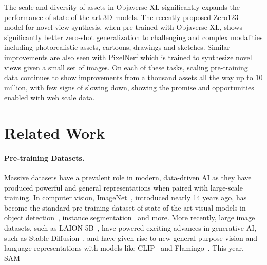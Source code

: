 The scale and diversity of assets in Objaverse-XL significantly expands the performance of state-of-the-art 3D models. The recently proposed Zero123~\cite{liu2023zero1to3} model for novel view synthesis, when pre-trained with Objaverse-XL, shows significantly better zero-shot generalization to challenging and complex modalities including photorealistic assets, cartoons, drawings and sketches. Similar improvements are also seen with PixelNerf which is trained to synthesize novel views given a small set of images. On each of these tasks, scaling pre-training data continues to show improvements from a thousand assets all the way up to 10 million, with few signs of slowing down, showing the promise and opportunities enabled with web scale data.

\section{Related Work}

\paragraph{Pre-training Datasets.}
Massive datasets have a prevalent role in modern, data-driven AI as they have produced powerful and general representations when paired with large-scale training. 
In computer vision, ImageNet~\cite{deng2009imagenet}, introduced nearly 14 years ago, has become the standard pre-training dataset of state-of-the-art visual models in object detection~\cite{ren2015faster,carion2020end}, instance segmentation~\cite{he2017mask,cheng2021mask2former} and more.
More recently, large image datasets, such as LAION-5B~\cite{schuhmann2022laion}, have powered exciting advances in generative AI, such as Stable Diffusion~\cite{rombach2022high}, and have given rise to new general-purpose vision and language representations with models like CLIP~\cite{radford2021learning} and Flamingo~\cite{alayrac2022flamingo}. This year, SAM~\cite{kirillov2023segment}

